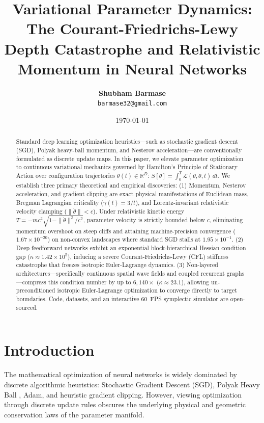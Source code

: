 \documentclass[10pt,twocolumn]{article}
\title{\LARGE\textbf{Variational Parameter Dynamics: The Courant-Friedrichs-Lewy Depth Catastrophe and Relativistic Momentum in Neural Networks}}
\author{
  \textbf{Shubham Barmase} \\
  \texttt{barmase32@gmail.com}
}
\date{\today}
\begin{document}
\maketitle

\begin{abstract}
Standard deep learning optimization heuristics---such as stochastic gradient descent (SGD), Polyak heavy-ball momentum, and Nesterov acceleration---are conventionally formulated as discrete update maps. In this paper, we elevate parameter optimization to continuous variational mechanics governed by Hamilton's Principle of Stationary Action over configuration trajectories $\theta(t) \in \mathbb{R}^D$: $S[\theta] = \int_0^T \mathcal{L}(\theta, \dot{\theta}, t) \, dt$. We establish three primary theoretical and empirical discoveries: (1) Momentum, Nesterov acceleration, and gradient clipping are exact physical manifestations of Euclidean mass, Bregman Lagrangian criticality ($\gamma(t)=3/t$), and Lorentz-invariant relativistic velocity clamping ($\|\dot{\theta}\| < c$). Under relativistic kinetic energy $T = -mc^2\sqrt{1-\|\dot{\theta}\|^2/c^2}$, parameter velocity is strictly bounded below $c$, eliminating momentum overshoot on steep cliffs and attaining machine-precision convergence ($1.67 \times 10^{-20}$) on non-convex landscapes where standard SGD stalls at $1.95 \times 10^{-1}$. (2) Deep feedforward networks exhibit an exponential block-hierarchical Hessian condition gap ($\kappa \approx 1.42 \times 10^5$), inducing a severe Courant-Friedrichs-Lewy (CFL) stiffness catastrophe that freezes isotropic Euler-Lagrange dynamics. (3) Non-layered architectures---specifically continuous spatial wave fields and coupled recurrent graphs---compress this condition number by up to $6,140\times$ ($\kappa \approx 23.1$), allowing un-preconditioned isotropic Euler-Lagrange optimization to converge directly to target boundaries. Code, datasets, and an interactive 60~FPS symplectic simulator are open-sourced.
\end{abstract}

\section{Introduction}

The mathematical optimization of neural networks is widely dominated by discrete algorithmic heuristics: Stochastic Gradient Descent (SGD), Polyak Heavy Ball \cite{polyak1964some}, Adam, and heuristic gradient clipping. However, viewing optimization through discrete update rules obscures the underlying physical and geometric conservation laws of the parameter manifold.
\end{document}
